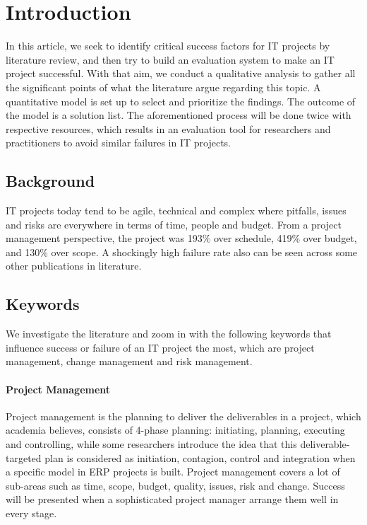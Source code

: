 
\section{Introduction}

In this article, we seek to identify critical success factors for IT projects by literature review, and then try to build an evaluation system to make an IT project successful. With that aim, we conduct a qualitative analysis to gather all the significant points of what the literature argue regarding this topic. A quantitative model is set up to select and prioritize the findings. The outcome of the model is a solution list. The aforementioned process will be done twice with respective resources, which results in an evaluation tool for researchers and practitioners to avoid similar failures in IT projects.

\subsection{Background}
IT projects today tend to be agile, technical and complex\parencite[p. 2]{4} where pitfalls, issues and risks are everywhere in terms of time, people and budget. From a
project management perspective, the project was 193\% over schedule, 419\% over budget, and 130\% over scope\parencite[p. 8]{6}. A shockingly high failure rate also can be seen across some other publications in literature\parencite{2,3}.

\subsection{Keywords}
We investigate the literature and zoom in with the following keywords that influence success or failure of an IT project the most, which are project management, change management and risk management.

\paragraph{Project Management}
Project management is the planning to deliver the deliverables in a project, which academia believes, consists of 4-phase planning: initiating, planning, executing and controlling, while some researchers introduce the idea that this deliverable-targeted plan is considered as initiation, contagion, control and integration when a specific model in ERP projects is built\parencite[p. 3]{2}. Project management covers a lot of sub-areas such as time, scope, budget, quality, issues, risk and change. Success will be presented when a sophisticated project manager arrange them well in every stage.

